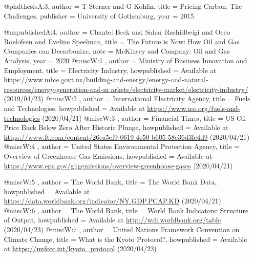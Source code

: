 @phdthesis{A:3,
author = {T Sterner and G Kohlin},
title = {Pricing Carbon: The Challenges},
publisher = {University of Gothenburg},
year = {2015}
}

@unpublished{A:4,
author = {Chantel Beck and Sahar Rashidbeigi and Occo Roelofsen and Eveline Speelman},
title = {The Future is Now: How Oil and Gas Companies can Decarbonixe},
note = {McKinsey and Company: Oil and Gas Analysis},
year = {2020}
}
@misc{W:1 ,
    author = {Ministry of Business Innovation and Employment},
    title = {Electricity Industry},
    howpublished = {Available at \url{https://www.mbie.govt.nz/building-and-energy/energy-and-natural-resources/energy-generation-and-m                 arkets/electricity-market/electricity-industry/} (2019/04/23)}
}
@misc{W:2 ,
    author = {International Electricity Agency},
    title = {Fuels and Technologies},
    howpublished = {Available at \url{https://www.iea.org/fuels-and-technologies} (2020/04/21)}
}
@misc{W:3 ,
    author = {Financial Times},
    title = {US Oil Price Back Below Zero After Historic Plunge},
    howpublished = {Available at \url{https://www.ft.com/content/26ea5ef9-0619-4e50-b605-58e36d3fc4d9} (2020/04/21)}
}
@misc{W:4 ,
    author = {United States Environmental Protection Agency},
    title = {Overview of Greenhouse Gas Emissions},
    howpublished = {Available at \url{https://www.epa.gov/ghgemissions/overview-greenhouse-gases} (2020/04/21)}
}

@misc{W:5 ,
    author = {The World Bank},
    title = {The World Bank Data},
    howpublished = {Available at \url{https://data.worldbank.org/indicator/NY.GDP.PCAP.KD} (2020/04/21)}
}
@misc{W:6 ,
    author = {The World Bank},
    title = {World Bank Indicators: Structure of Output},
    howpublished = {Available at \url{http://wdi.worldbank.org/table} (2020/04/23)}
}
@misc{W:7 ,
    author = {United Nations Framework Convention on Climate Change},
    title = {What is the Kyoto Protocol?},
    howpublished = {Available at \url{https://unfccc.int/kyoto_protocol} (2020/04/23)}
}

